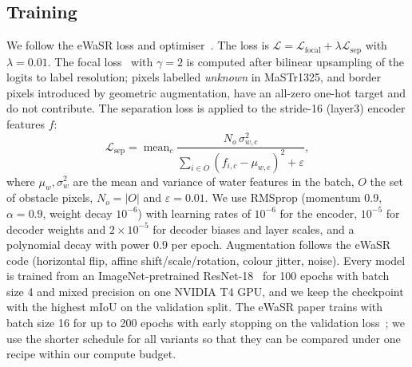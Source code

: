 \documentclass[conference]{IEEEtran}
\begin{document}
\subsection{Training}
\label{sec:training}
We follow the eWaSR loss and optimiser~\cite{tersek2023ewasr,bovcon2022wasr}. The loss is $\mathcal{L}=\mathcal{L}_{\mathrm{focal}}+\lambda\mathcal{L}_{\mathrm{sep}}$ with $\lambda=0.01$. The focal loss~\cite{lin2017focal} with $\gamma=2$ is computed after bilinear upsampling of the logits to label resolution; pixels labelled \emph{unknown} in MaSTr1325, and border pixels introduced by geometric augmentation, have an all-zero one-hot target and do not contribute. The separation loss is applied to the stride-16 (layer3) encoder features $f$:
\begin{equation}
\mathcal{L}_{\mathrm{sep}}=\operatorname{mean}_c\frac{N_o\,\sigma^2_{w,c}}{\sum_{i\in O}(f_{i,c}-\mu_{w,c})^2+\varepsilon},
\end{equation}
where $\mu_w,\sigma^2_w$ are the mean and variance of water features in the batch, $O$ the set of obstacle pixels, $N_o=|O|$ and $\varepsilon=0.01$. We use RMSprop (momentum 0.9, $\alpha=0.9$, weight decay $10^{-6}$) with learning rates of $10^{-6}$ for the encoder, $10^{-5}$ for decoder weights and $2\times10^{-5}$ for decoder biases and layer scales, and a polynomial decay with power 0.9 per epoch. Augmentation follows the eWaSR code (horizontal flip, affine shift/scale/rotation, colour jitter, noise). Every model is trained from an ImageNet-pretrained ResNet-18~\cite{he2016resnet} for 100 epochs with batch size 4 and mixed precision on one NVIDIA T4 GPU, and we keep the checkpoint with the highest mIoU on the validation split. The eWaSR paper trains with batch size 16 for up to 200 epochs with early stopping on the validation loss~\cite{tersek2023ewasr}; we use the shorter schedule for all variants so that they can be compared under one recipe within our compute budget.
\end{document}

